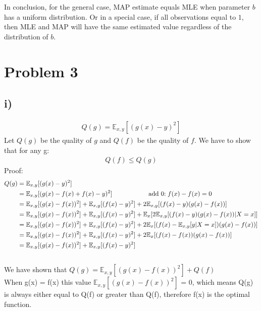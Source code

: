 \documentclass[twoside,11pt]{homework}
\begin{document}
In conclusion, for the general case, MAP estimate equals MLE when parameter $b$ has a uniform distribution. Or in a special case, if all observations equal to $1$, then MLE and MAP will have the same estimated value regardless of the distribution of $b$. 
\newpage
\section*{Problem 3}
\subsection*{i)}
\begin{equation}
\begin{split}
Q(g) = \mathbb{E}_{x,y}[(g(x) - y)^{2}] 
\end{split}
\end{equation}
Let $Q(g)$  be the quality of $g$ and $Q(f)$
be the quality of $f$. We have to show that for any g: 
\begin{equation}
\begin{split}
Q(f)\leq Q(g)
\end{split}
\end{equation}
Proof:  \\
\begin{equation}
\begin{split}
Q(g) &= \mathbb{E}_{x,y}[(g(x)-y)^2] \\
&=\mathbb{E}_{x,y}[(g(x)-f(x)+f(x)-y)^2]  \hspace{20mm} \text{add 0$:f(x)-f(x) = 0$} \\
&=\mathbb{E}_{x,y}[(g(x)-f(x))^2]+\mathbb{E}_{x,y}[(f(x)-y)^2]
+2\mathbb{E}_{x,y}[(f(x)-y)(g(x)-f(x))] \\
&=\mathbb{E}_{x,y}[(g(x)-f(x))^2]
+\mathbb{E}_{x,y}[(f(x)-y)^2]
+\mathbb{E}_{x}[2\mathbb{E}_{x,y}[(f(x)-y)(g(x)-f(x))|X=x]] \\
&=\mathbb{E}_{x,y}[(g(x)-f(x))^2]
+\mathbb{E}_{x,y}[(f(x)-y)^2]
+2\mathbb{E}_{x}[(f(x)-\mathbb{E}_{x,y}[y|X=x])(g(x)-f(x))] \\
&=\mathbb{E}_{x,y}[(g(x)-f(x))^2]
+\mathbb{E}_{x,y}[(f(x)-y)^2]
+2\mathbb{E}_{x}[(f(x)-f(x))(g(x)-f(x))] \\
&=\mathbb{E}_{x,y}[(g(x)-f(x))^2]
+\mathbb{E}_{x,y}[(f(x)-y)^2] \\
\end{split}
\end{equation}
\\
We have shown that $Q(g) =\mathbb{E}_{x,y}[(g(x)-f(x))^2]+Q(f)$ \\
When g(x) = f(x) this value $\mathbb{E}_{x,y}[(g(x)-f(x))^2]$ = 0, 
which means Q(g) is always either equal to Q(f) or greater than Q(f), therefore f(x) is the optimal function. 
\end{document}

